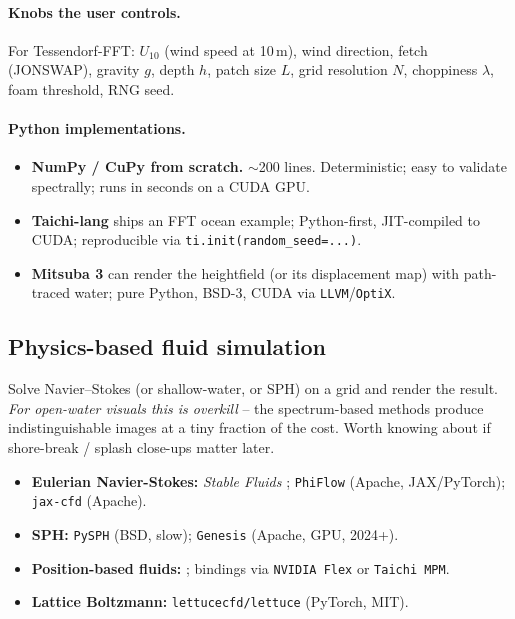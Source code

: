 \documentclass[11pt,a4paper]{article}
\newcommand{\code}[1]{\texttt{\small #1}}
\begin{document}
\paragraph{Knobs the user controls.} For Tessendorf-FFT:
$U_{10}$ (wind speed at 10\,m), wind direction, fetch (JONSWAP),
gravity $g$, depth $h$, patch size $L$, grid resolution $N$,
choppiness $\lambda$, foam threshold, RNG seed.

\paragraph{Python implementations.}
\begin{itemize}[leftmargin=1.5em,itemsep=0.3em]
  \item \textbf{NumPy / CuPy from scratch.} $\sim$200 lines. Deterministic;
        easy to validate spectrally; runs in seconds on a CUDA GPU.
  \item \textbf{Taichi-lang} \citep{hu2019} ships an FFT ocean example;
        Python-first, JIT-compiled to CUDA; reproducible via
        \code{ti.init(random\_seed=...)}.
  \item \textbf{Mitsuba 3} \citep{mitsuba3} can render the heightfield
        (or its displacement map) with path-traced water; pure Python,
        BSD-3, CUDA via \code{LLVM}/\code{OptiX}.
\end{itemize}

\subsection{Physics-based fluid simulation}

Solve Navier--Stokes (or shallow-water, or SPH) on a grid and render the
result. \emph{For open-water visuals this is overkill} -- the
spectrum-based methods produce indistinguishable images at a tiny
fraction of the cost. Worth knowing about if shore-break / splash
close-ups matter later.

\begin{itemize}[leftmargin=1.5em,itemsep=0.3em]
  \item \textbf{Eulerian Navier-Stokes:} \emph{Stable Fluids} \citep{stam1999};
        \code{PhiFlow} \citep{phiflow} (Apache, JAX/PyTorch);
        \code{jax-cfd} (Apache).
  \item \textbf{SPH:} \code{PySPH} (BSD, slow);
        \code{Genesis} \citep{genesis} (Apache, GPU, 2024+).
  \item \textbf{Position-based fluids:} \citet{macklin2013}; bindings via
        \code{NVIDIA Flex} or \code{Taichi MPM}.
  \item \textbf{Lattice Boltzmann:} \code{lettucecfd/lettuce} (PyTorch, MIT).
\end{itemize}
\end{document}
